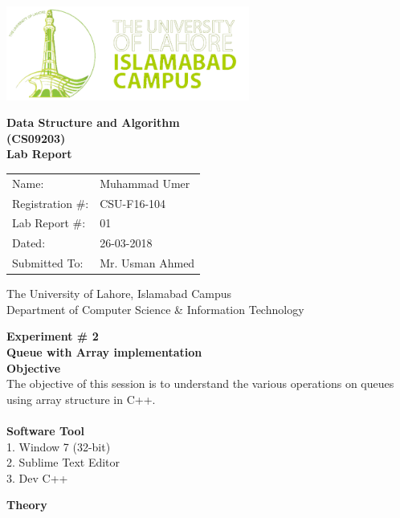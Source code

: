\documentclass[11pt]{article}            %
\begin{document}
\begin{titlepage}
    \centering
  \vfill
    \includegraphics[width=8cm]{uni_logo.png} \\ 
	\vskip2cm
    {\bfseries\Large
	Data Structure and Algorithm \\ (CS09203)\\
	
	\vskip2cm
	Lab Report 
	 
	\vskip2cm
	}    

\begin{center}
\begin{tabular}{ l l  } 

Name: & Muhammad Umer \\ 
Registration \#: & CSU-F16-104 \\ 
Lab Report \#: & 01 \\ 
 Dated:& 26-03-2018\\ 
Submitted To:& Mr. Usman Ahmed\\ 

\end{tabular}
\end{center}
    \vfill
    The University of Lahore, Islamabad Campus\\
Department of Computer Science \& Information Technology
\end{titlepage}


    
    {\bfseries\Large
\centering
	Experiment \# 2 \\

Queue with Array implementation\\
	
	}    
 \vskip1cm
 \textbf {Objective}\\ The objective of this session is to understand the various operations on queues using array structure in C++.\\~\\
 \textbf {Software Tool} \\
1.  Window 7 (32-bit)\\
2. Sublime Text Editor\\
3. Dev C++

\textbf{Theory }
\end{document}
